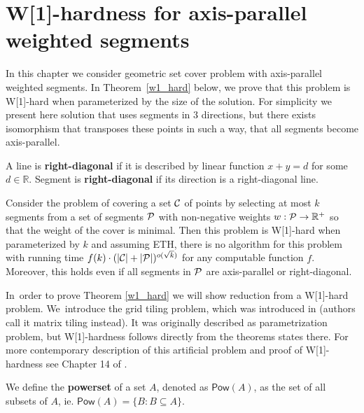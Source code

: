 \chapter{W[1]-hardness for axis-parallel weighted segments}
\label{chapter:w1_hard}

In this chapter we consider geometric set cover problem with 
axis-parallel weighted segments.
In Theorem~\ref{w1_hard} below, we prove that this problem is 
W[1]-hard when parameterized by the size of the solution.
For simplicity we present here solution that uses segments in
3 directions, but there exists isomorphism that transposes
these points in such a way, that all segments become axis-parallel.

\begin{defi}
	A line is \textbf{right-diagonal} if it is
	described by linear function $x + y = d$ for some $d \in \mathbb{R}$.
	Segment is \textbf{right-diagonal} if its
	direction is a right-diagonal line.
\end{defi}

\begin{tw}
\label{w1_hard}
	Consider the problem of covering a set $\mathcal{C}$ of points
	by selecting at most $k$ segments
	from a set of segments $\mathcal{P}$ 
	with non-negative weights $w : \mathcal{P} \rightarrow \mathbb{R^+}$
	so that the weight of the cover is minimal.
	Then this problem is W[1]-hard when parameterized by $k$ and
	assuming ETH, there is no algorithm for this
	problem with running time
	$f(k)\cdot(|\mathcal{C}| + |\mathcal{P}|)^{o(\sqrt{k})}$
	for any computable function $f$.
	Moreover, this holds even if all segments in $\mathcal{P}$
	are axis-parallel or right-diagonal.
\end{tw}

In~order to prove Theorem \ref{w1_hard}
we will show reduction from a W[1]-hard problem.
We~introduce the grid tiling problem,
which was introduced in \cite{marx_grid_tiling}
(authors call it matrix tiling instead).
It was originally described as parametrization problem,
but W[1]-hardness follows directly from the theorems states there.
For more contemporary description of this artificial problem
and proof of W[1]-hardness see Chapter 14 of \cite{platypus}.

\newcommand{\pow}{\mathsf{Pow}}

\begin{defi}
We define the \textbf{powerset} of a set $A$, denoted as $\pow(A)$,
as the set of all subsets of $A$, ie. $\pow(A) = \{B : B \subseteq A\}$.
\end{defi}

